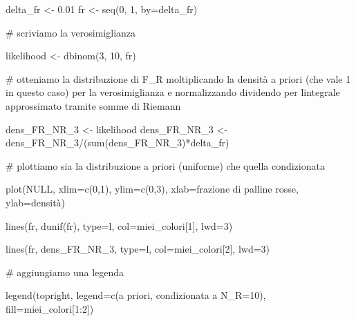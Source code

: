 \documentclass[
  italian,
  letterpaper,
]{book}
\newenvironment{Shaded}{\begin{snugshade}}{\end{snugshade}}
\newcommand{\AttributeTok}[1]{\textcolor[rgb]{0.40,0.45,0.13}{#1}}
\newcommand{\CommentTok}[1]{\textcolor[rgb]{0.37,0.37,0.37}{#1}}
\newcommand{\ConstantTok}[1]{\textcolor[rgb]{0.56,0.35,0.01}{#1}}
\newcommand{\DecValTok}[1]{\textcolor[rgb]{0.68,0.00,0.00}{#1}}
\newcommand{\FloatTok}[1]{\textcolor[rgb]{0.68,0.00,0.00}{#1}}
\newcommand{\FunctionTok}[1]{\textcolor[rgb]{0.28,0.35,0.67}{#1}}
\newcommand{\NormalTok}[1]{\textcolor[rgb]{0.00,0.23,0.31}{#1}}
\newcommand{\OtherTok}[1]{\textcolor[rgb]{0.00,0.23,0.31}{#1}}
\newcommand{\SpecialCharTok}[1]{\textcolor[rgb]{0.37,0.37,0.37}{#1}}
\newcommand{\StringTok}[1]{\textcolor[rgb]{0.13,0.47,0.30}{#1}}
\theoremstyle{definition}
\theoremstyle{remark}
\begin{document}
\begin{Shaded}
\begin{Highlighting}[]
\NormalTok{delta\_fr }\OtherTok{\textless{}{-}} \FloatTok{0.01}
\NormalTok{fr }\OtherTok{\textless{}{-}} \FunctionTok{seq}\NormalTok{(}\DecValTok{0}\NormalTok{, }\DecValTok{1}\NormalTok{, }\AttributeTok{by=}\NormalTok{delta\_fr)}

\CommentTok{\# scriviamo la verosimiglianza}

\NormalTok{likelihood }\OtherTok{\textless{}{-}} \FunctionTok{dbinom}\NormalTok{(}\DecValTok{3}\NormalTok{, }\DecValTok{10}\NormalTok{, fr)}

\CommentTok{\# otteniamo la distribuzione di F\_R moltiplicando la densità a priori (che vale 1 in questo caso) per la verosimiglianza e normalizzando dividendo per l\textquotesingle{}integrale approssimato tramite somme di Riemann}

\NormalTok{dens\_FR\_NR\_3 }\OtherTok{\textless{}{-}}\NormalTok{ likelihood}
\NormalTok{dens\_FR\_NR\_3 }\OtherTok{\textless{}{-}}\NormalTok{ dens\_FR\_NR\_3}\SpecialCharTok{/}\NormalTok{(}\FunctionTok{sum}\NormalTok{(dens\_FR\_NR\_3)}\SpecialCharTok{*}\NormalTok{delta\_fr)}

\CommentTok{\# plottiamo sia la distribuzione a priori (uniforme) che quella condizionata}

\FunctionTok{plot}\NormalTok{(}\ConstantTok{NULL}\NormalTok{, }\AttributeTok{xlim=}\FunctionTok{c}\NormalTok{(}\DecValTok{0}\NormalTok{,}\DecValTok{1}\NormalTok{), }\AttributeTok{ylim=}\FunctionTok{c}\NormalTok{(}\DecValTok{0}\NormalTok{,}\DecValTok{3}\NormalTok{), }\AttributeTok{xlab=}\StringTok{\textquotesingle{}frazione di palline rosse\textquotesingle{}}\NormalTok{, }\AttributeTok{ylab=}\StringTok{\textquotesingle{}densità\textquotesingle{}}\NormalTok{)}

\FunctionTok{lines}\NormalTok{(fr, }\FunctionTok{dunif}\NormalTok{(fr), }\AttributeTok{type=}\StringTok{\textquotesingle{}l\textquotesingle{}}\NormalTok{, }\AttributeTok{col=}\NormalTok{miei\_colori[}\DecValTok{1}\NormalTok{], }\AttributeTok{lwd=}\DecValTok{3}\NormalTok{)}


\FunctionTok{lines}\NormalTok{(fr, dens\_FR\_NR\_3, }\AttributeTok{type=}\StringTok{\textquotesingle{}l\textquotesingle{}}\NormalTok{, }\AttributeTok{col=}\NormalTok{miei\_colori[}\DecValTok{2}\NormalTok{], }\AttributeTok{lwd=}\DecValTok{3}\NormalTok{)}


\CommentTok{\# aggiungiamo una legenda}

\FunctionTok{legend}\NormalTok{(}\StringTok{\textquotesingle{}topright\textquotesingle{}}\NormalTok{, }\AttributeTok{legend=}\FunctionTok{c}\NormalTok{(}\StringTok{\textquotesingle{}a priori\textquotesingle{}}\NormalTok{, }\StringTok{\textquotesingle{}condizionata a N\_R=10\textquotesingle{}}\NormalTok{), }\AttributeTok{fill=}\NormalTok{miei\_colori[}\DecValTok{1}\SpecialCharTok{:}\DecValTok{2}\NormalTok{])}
\end{Highlighting}
\end{Shaded}
\end{document}
